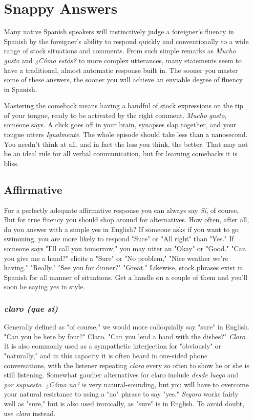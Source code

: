 \chapter{Snappy Answers}

Many native Spanish speakers will instinctively judge a foreigner's fluency in Spanish by the foreigner's ability to respond quickly
and conventionally to a wide range of stock situations and comments.
From such simple remarks as \emph{Mucho gusto} and \emph{¿Cómo estás?} to more
complex utterances, many statements seem to have a traditional, almost automatic response built in. The sooner you master some of
these answers, the sooner you will achieve an enviable degree of fluency in Spanish.

Mastering the comeback means having a handful of stock expressions on the tip of your tongue, ready to be activated by the right
comment. \emph{Mucho gusto}, someone says. A click goes off in your brain,
synapses slap together, and your tongue utters \emph{Igualmente}. The whole
episode should take less than a nanosecond. You needn't think at all,
and in fact the less you think, the better. That may not be an ideal rule
for all verbal communication, but for learning comebacks it is bliss.

\section{Affirmative}

For a perfectly adequate affirmative response you can always
say \emph{Sí}, of course, But for true fluency you should shop around for alternatives. How often, after all, do you answer with a simple yes in
English? If someone asks if you want to go swimming, you are more
likely to respond "Sure" or "All right" than "Yes." If someone says "I'll
call you tomorrow," you may utter an "Okay" or "Good." "Can you
give me a hand?" elicits a "Sure" or "No problem," "Nice weather
we're having." "Really." "See you for dinner?" "Great." Likewise,
stock phrases exist in Spanish for all manner of situations. Get a
handle on a couple of them and you'll soon be saying yes in style.

\subsection{\emph{claro (que sí)}}

Generally defined as "of course," we would more colloquially
say "sure" in English. "Can you be here by four?" Claro. "Can you
lend a hand with the dishes?" \emph{Claro}. It is also commonly used as a
sympathetic interjection for "obviously" or "naturally," and in this capacity it is often heard in one-sided phone conversations, with the listener repeating \emph{claro} every so often to show he or she is still listening.
Somewhat gaudier alternatives for claro include \emph{desde luego} and \emph{por
supuesto}. \emph{¿Cómo no?} is very natural-sounding, but you will have to
overcome your natural resistance to using a "no" phrase to say "yes."
\emph{Seguro} works fairly well as "sure," but is also used ironically, as "sure"
is in English. To avoid doubt, use \emph{claro} instead.

